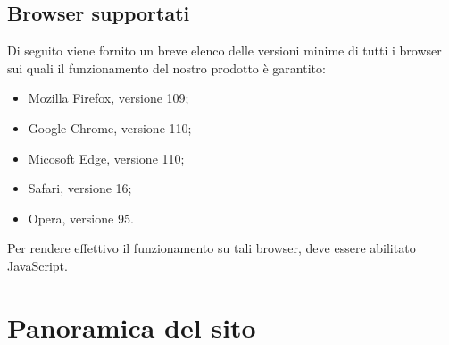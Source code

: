 \subsection{Browser supportati}
Di seguito viene fornito un breve elenco delle versioni minime di tutti i browser sui quali
il funzionamento del nostro prodotto è garantito:
\begin{itemize}
	\item Mozilla Firefox, versione 109;
	\item Google Chrome, versione 110;
	\item Micosoft Edge, versione 110;
	\item Safari, versione 16;
	\item Opera, versione 95.
\end{itemize}
Per rendere effettivo il funzionamento su tali browser, deve essere abilitato JavaScript.
\pagebreak



\section{Panoramica del sito}

